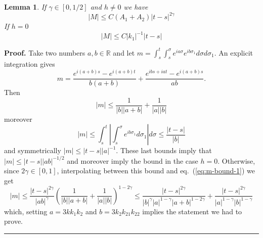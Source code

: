 \documentclass[a4paper,12pt,reqno]{article}
\newcommand{\RR}{\mathbb{R}}
\newtheorem{lemma}[theorem]{Lemma}
\newenvironment{proof}[1][Proof]{\textbf{#1.} }{\ \rule{0.5em}{0.5em}}
\begin{document}
\begin{lemma}
\label{lemma:M-bounds}
If $\gamma \in[0,1/2]$ and $h \neq 0$ we have
$$
|M| \le C (A_1+A_2)  |t-s|^{2\gamma} 
$$  
If $h=0$
$$
|M| \le C |k_1|^{-1}  |t-s|
$$  
\end{lemma}
\begin{proof}
  Take two numbers $a,b \in \RR$ and let 
$
m = \int_s^t \int_s^\sigma e^{i a \sigma} e^{i b \sigma_1} d\sigma d\sigma_1 
$.
An explicit integration gives
$$
m = \frac{e^{i(a+b)s}-e^{i(a+b)t}}{b (a+b)} 
+\frac{e^{i bs+iat}-e^{i(a+b)s}}{ab}.
$$
Then
\begin{equation}
  \label{eq:m-bound-1}
|m| \le \frac{1}{|b||a+b|}+\frac{1}{|a||b|}
\end{equation}
moreover
\begin{equation*}
|m| \le  \int_s^t \left|\int_s^\sigma  e^{i b \sigma_1}
  d\sigma_1\right| d\sigma \le \frac{|t-s|}{|b|}  
\end{equation*}
and symmetrically $|m| \le |t-s| |a|^{-1}$. These last bounds imply
that  $|m| \le |t-s||ab|^{-1/2}$ and moreover imply the bound in the case $h=0$.
Otherwise, since $2\gamma \in [0,1]$,  interpolating between this bound and
eq.~(\ref{eq:m-bound-1}) we get
\begin{equation}
  \label{eq:m-bound-3}
 |m| \le \frac{|t-s|^{2\gamma}}{|ab|^{\gamma}}
 \left(\frac{1}{|b||a+b|}+\frac{1}{|a||b|}\right)^{1-2\gamma} \le 
\frac{|t-s|^{2\gamma}}{|b|^{\gamma}|a|^{1-\gamma}|a+b|^{1-2\gamma}}+\frac{|t-s|^{2\gamma}}{|a|^{1-\gamma}|b|^{1-\gamma}}
\end{equation}
which, setting $a = 3k k_1 k_2$ and $b = 3 k_2 k_{21} k_{22}$ implies
the statement we had to prove.
\end{proof}
\end{document}
